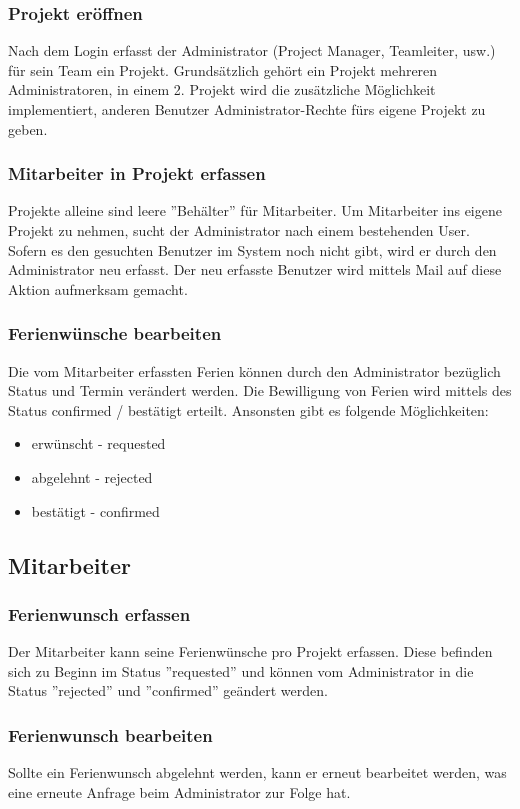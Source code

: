 \subsubsection{Projekt er\"offnen}
Nach dem Login erfasst der Administrator (Project Manager, Teamleiter, usw.) f\"ur sein Team ein Projekt. Grunds\"atzlich geh\"ort ein Projekt mehreren Administratoren, in einem 2. Projekt wird die zus\"atzliche M\"oglichkeit implementiert, anderen Benutzer Administrator-Rechte f\"urs eigene Projekt zu geben.

\subsubsection{Mitarbeiter in Projekt erfassen}
Projekte alleine sind leere ''Beh\"alter'' f\"ur Mitarbeiter. Um Mitarbeiter ins eigene Projekt zu nehmen, sucht der Administrator nach einem bestehenden User. Sofern es den gesuchten Benutzer im System noch nicht gibt, wird er durch den Administrator neu erfasst. Der neu erfasste Benutzer wird mittels Mail auf diese Aktion aufmerksam gemacht.

\subsubsection{Ferienw\"unsche bearbeiten}
Die vom Mitarbeiter erfassten Ferien k\"onnen durch den Administrator bez\"uglich Status und Termin ver\"andert werden. Die Bewilligung von Ferien wird mittels des Status confirmed / best\"atigt erteilt. Ansonsten gibt es folgende M\"oglichkeiten:
\begin{itemize}
\item erw\"unscht - requested
\item abgelehnt - rejected
\item best\"atigt - confirmed
\end{itemize}


\subsection{Mitarbeiter}
\subsubsection{Ferienwunsch erfassen}
Der Mitarbeiter kann seine Ferienw\"unsche pro Projekt erfassen. Diese befinden sich zu Beginn im Status ''requested'' und k\"onnen vom Administrator in die Status ''rejected'' und ''confirmed'' ge\"andert werden.

\subsubsection{Ferienwunsch bearbeiten}
Sollte ein Ferienwunsch abgelehnt werden, kann er erneut bearbeitet werden, was eine erneute Anfrage beim Administrator zur Folge hat.

